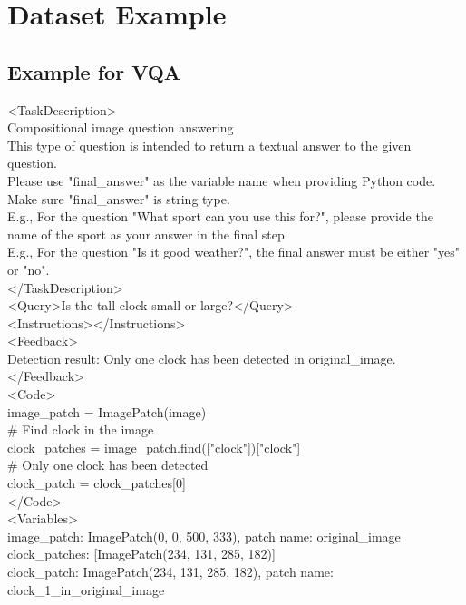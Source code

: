 \documentclass{article} %
\newcommand{\revise}[1]{{#1}}
\newcommand{\methodname}{MATA}
\newcommand{\datasetname}{\methodname-SFT-90K}
\begin{document}
\section{\revise{Dataset Example}}
\label{sec:dataset_example}

\subsection{\revise{Example for VQA}}

\begin{prompt}[title={Example \thetcbcounter: \datasetname{} Example Input}]
<TaskDescription>\\
Compositional image question answering\\
This type of question is intended to return a textual answer to the given question. \\
Please use "final\_answer" as the variable name when providing Python code. Make sure "final\_answer" is string type.\\
E.g., For the question "What sport can you use this for?", please provide the name of the sport as your answer in the final step.\\
E.g., For the question "Is it good weather?", the final answer must be either "yes" or "no".\\
</TaskDescription>\\
<Query>Is the tall clock small or large?</Query>\\
<Instructions></Instructions>\\
<Feedback>\\
Detection result: Only one clock has been detected in original\_image.\\
</Feedback>\\
<Code>\\
image\_patch = ImagePatch(image)\\
\# Find clock in the image\\
clock\_patches = image\_patch.find(["clock"])["clock"]\\
\# Only one clock has been detected\\
clock\_patch = clock\_patches[0]\\
</Code>\\
<Variables>\\
image\_patch: ImagePatch(0, 0, 500, 333), patch name: original\_image\\
clock\_patches: [ImagePatch(234, 131, 285, 182)]\\
clock\_patch: ImagePatch(234, 131, 285, 182), patch name: clock\_1\_in\_original\_image\\

\end{prompt}
\end{document}
